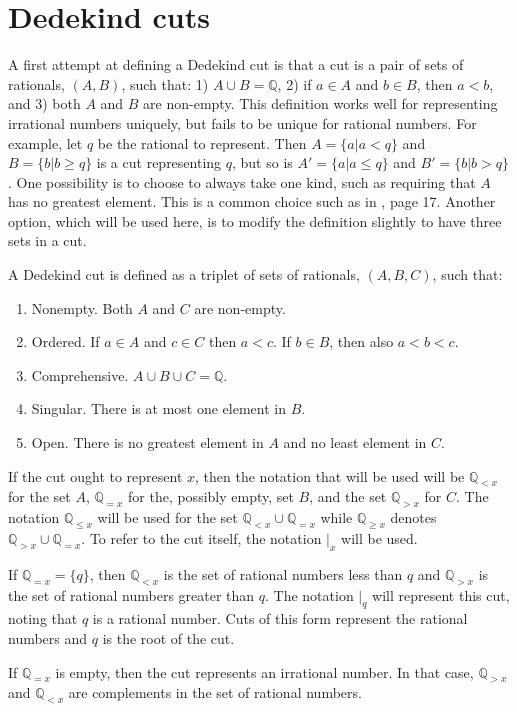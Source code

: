 \documentclass[12pt]{article}
\newcommand{\qcut}[2][x]{\ensuremath{\mathbb{Q}_{#2 #1}}}
\newcommand{\qlt}[1][x]{\qcut[#1]{<}}
\newcommand{\qeq}[1][x]{\qcut[#1]{=}}
\newcommand{\qgt}[1][x]{\qcut[#1]{>}}
\newcommand{\qgeq}[1][x]{\qcut[#1]{\geq}}
\newcommand{\qleq}[1][x]{\qcut[#1]{\leq}}
\newcommand{\cut}[1][x]{{\vert}_{#1} }
\begin{document}
\section{Dedekind cuts}

A first attempt at defining a Dedekind cut is that a cut is a pair of sets of rationals, $(A, B)$, such that: 1) $A \cup B = \mathbb{Q}$, 2) if $a \in A$ and $b \in B$, then $a < b$, and 3) both $A$ and $B$ are non-empty. This definition works well for representing irrational numbers uniquely, but fails to be unique for rational numbers. For example, let $q$ be the rational to represent. Then $A = \{a | a < q\}$ and $B= \{b | b \geq q\}$ is a cut representing $q$, but so is  $A' = \{a | a \leq q\}$ and $B'= \{b | b > q\}$. One possibility is to choose to always take one kind, such as requiring that $A$ has no greatest element. This is a common choice such as in \cite{rudin}, page 17. Another option, which will be used here, is to modify the definition slightly to have three sets in a cut.

A Dedekind cut is defined as a triplet of sets of rationals, $(A, B, C)$, such that: 
\begin{enumerate}
    \item Nonempty. Both $A$ and $C$ are non-empty.
    \item Ordered. If $a \in A$ and $c \in C$ then $a < c$. If $b \in B$, then also $a < b < c$. 
    \item Comprehensive. $A \cup B \cup C = \mathbb{Q}$.
    \item Singular. There is at most one element in $B$.
    \item Open. There is no greatest element in $A$ and no least element in $C$.
\end{enumerate}
If the cut ought to represent $x$, then the notation that will be used will be $\qlt$ for the set $A$, $\qeq$ for the, possibly empty, set $B$, and the set $\qgt$ for $C$. The notation $\qleq$ will be used for the set $\qlt \cup \qeq$ while $\qgeq$ denotes $\qgt \cup \qeq$. To refer to the cut itself, the notation $\cut$ will be used. 



If $\qeq = \{q\}$, then $\qlt$ is the set of rational numbers less than $q$ and $\qgt$ is the set of rational numbers greater than $q$. The notation $\cut[q]$ will represent this cut, noting that $q$ is a rational number. Cuts of this form represent the rational numbers and $q$ is the root of the cut. 

If $\qeq$ is empty, then the cut represents an irrational number. In that case, $\qgt$ and $\qlt$ are complements in the set of rational numbers. 
\end{document}
